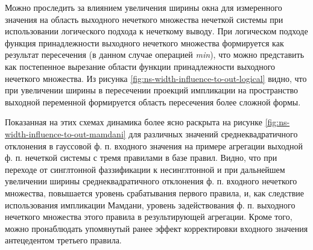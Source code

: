 Можно проследить за влиянием увеличения ширины окна для измеренного значения на область выходного нечеткого множества нечеткой системы при использовании логического подхода к нечеткому выводу. При логическом подходе функция принадлежности выходного нечеткого множества формируется как результат пересечения (в данном случае операцией \textit{min}), что можно представить как постепенное вырезание области функции принадлежности выходного нечеткого множества. Из рисунка \cref{fig:ns-width-influence-to-out-logical} видно, что при увеличении ширины в пересечении проекций импликации на пространство выходной переменной формируется область пересечения более сложной формы.

Показанная на этих схемах динамика более ясно раскрыта на рисунке \cref{fig:ns-width-influence-to-out-mamdani} для различных значений среднеквадратичного отклонения в гауссовой ф. п. входного значения на примере агрегации выходной ф. п. нечеткой системы с тремя правилами в базе правил. Видно, что при переходе от синглтонной фаззификации к несинглтонной и при дальнейшем увеличении ширины среднеквадратичного отклонения ф. п. входного нечеткого множества, повышается уровень срабатывания первого правила, и, как следствие использования импликации Мамдани, уровень задействования ф. п. выходного нечеткого множества этого правила в результирующей агрегации. Кроме того, можно пронаблюдать упомянутый ранее эффект корректировки входного значения антецедентом третьего правила.

\FloatBarrier


